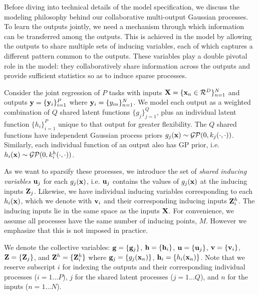 Before diving into technical details of the model specification, 
we discuss the modeling philosophy behind our collaborative multi-output Gaussian processes.
To learn the outputs jointly, we need a mechanism through which information can be transferred among the outputs.
This is achieved in the model by allowing the outputs to share multiple sets of inducing variables, 
each of which captures a different pattern common to the outputs.
These variables  play a double pivotal role in the model: they collaboratively share  information 
across the outputs and  provide sufficient statistics so as to induce sparse processes. 

\newcommand{\Zj}{\Z_j}
\newcommand{\Zhi}{\Z^h_i}
Consider the joint regression of $P$ tasks with inputs $\mathbf{X} = \{\mathbf{x}_n \in \mathcal{R}^D\}_{n=1}^N$ and outputs $\mathbf{y} = \{\mathbf{y}_i\}_{i=1}^P$ where $\mathbf{y}_i = \{y_{in}\}_{n=1}^N$.
We  model each output as a weighted combination of $Q$ shared latent functions $\{ g_{j}\}_{j=1}^{Q}$, plus an individual latent 
function $\{ h_{i}\}_{i=1}^{P}$ unique to that output for greater flexibility.
The $Q$ shared functions have independent Gaussian process priors  $g_j(\mathbf{x}) \sim \mathcal{GP}(0, k_j(\cdot,\cdot))$. %
Similarly, each individual function of an output also has GP prior, i.e.~$h_i(\mathbf{x}) \sim \mathcal{GP}(0, k^h_i(\cdot,\cdot))$. %


As we want to sparsify these processes, 
we introduce the set of \emph{shared inducing variables} $\mathbf{u}_j$ for  each $g_j(\mathbf{x})$, i.e. $\mathbf{u}_j$ contains the values of 
$g_j(\mathbf{x})$ at the inducing inputs $\mathbf{Z}_j$. Likewise, we have 
individual inducing variables corresponding to each  $h_i(\mathbf{x})$,  which we denote with $\mathbf{v}_i$ and their 
corresponding inducing inputs $\Zhi$.
%
The inducing inputs lie in the same space as the inputs $\mathbf{X}$.
For convenience, we  assume all processes have the same number of inducing points, $M$.
However we emphasize that this is not
 imposed in practice.


We denote the collective variables: $\mathbf{g} = \{\mathbf{g}_j\}$, $\mathbf{h} = \{\mathbf{h}_i \}$, $\mathbf{u} = \{\mathbf{u}_j\}$, $\mathbf{v} = \{\mathbf{v}_i\}$, $\Z = \{\Zj\}$, and $\Z^h = \{\Zhi \}$ where $\mathbf{g}_j = \{g_j(\mathbf{x}_n)\}$, $\mathbf{h}_i = \{h_i(\mathbf{x}_n)\}$. 
Note that we reserve subscript $i$ for indexing the outputs and their corresponding individual processes ($i = 1 \hdots P$), $j$ for the shared latent processes ($j = 1 \hdots Q$), and $n$ for the inputs ($n = 1 \hdots N$).
%
